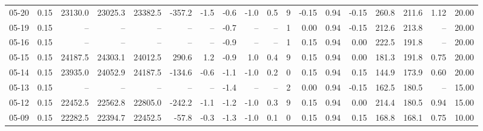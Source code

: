 \begin{threeparttable}
{\begin{tabular}{lrrrrrrrrrrrrrrrrr}
  05-20 &     0.15 & 23130.0 & 23025.3 & 23382.5 &     -357.2 &           -1.5 &                      -0.6 &                     -1.0 &                 0.5 &              9 &      -0.15 &      0.94 &          -0.15 &            260.8 &               211.6 &            1.12 &                  20.00 \\
  05-19 &     0.15 &      -- &      -- &      -- &         -- &             -- &                      -0.7 &                       -- &                  -- &              1 &       0.00 &      0.94 &          -0.15 &            212.6 &               213.8 &              -- &                  20.00 \\
  05-16 &     0.15 &      -- &      -- &      -- &         -- &             -- &                      -0.9 &                       -- &                  -- &              1 &       0.15 &      0.94 &           0.00 &            222.5 &               191.8 &              -- &                  20.00 \\
  05-15 &     0.15 & 24187.5 & 24303.1 & 24012.5 &      290.6 &            1.2 &                      -0.9 &                      1.0 &                 0.4 &              9 &       0.15 &      0.94 &           0.00 &            181.3 &               191.8 &            0.75 &                  20.00 \\
  05-14 &     0.15 & 23935.0 & 24052.9 & 24187.5 &     -134.6 &           -0.6 &                      -1.1 &                     -1.0 &                 0.2 &              0 &       0.15 &      0.94 &           0.15 &            144.9 &               173.9 &            0.60 &                  20.00 \\
  05-13 &     0.15 &      -- &      -- &      -- &         -- &             -- &                      -1.4 &                       -- &                  -- &              2 &       0.00 &      0.94 &          -0.15 &            162.5 &               180.5 &              -- &                  15.00 \\
  05-12 &     0.15 & 22452.5 & 22562.8 & 22805.0 &     -242.2 &           -1.1 &                      -1.2 &                     -1.0 &                 0.3 &              9 &       0.15 &      0.94 &           0.00 &            214.4 &               180.5 &            0.94 &                  15.00 \\
  05-09 &     0.15 & 22282.5 & 22394.7 & 22452.5 &      -57.8 &           -0.3 &                      -1.3 &                     -1.0 &                 0.1 &              0 &       0.15 &      0.94 &           0.15 &            168.8 &               168.1 &            0.75 &                  10.00 \\

\end{tabular}}
\end{threeparttable}

